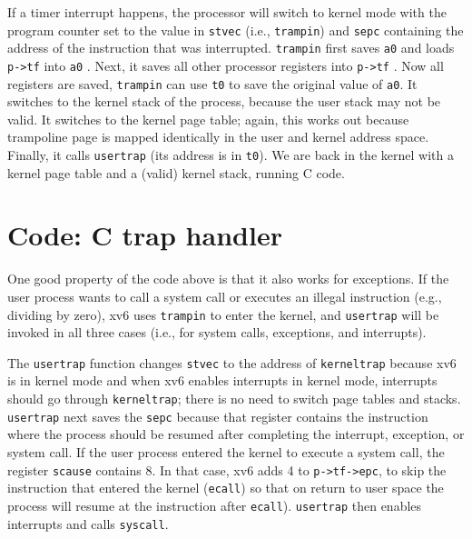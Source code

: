 If a timer interrupt happens, the processor will switch to kernel mode
with the program counter set to the value in \lstinline{stvec} (i.e.,
\lstinline{trampin}) and \lstinline{sepc} containing the address of
the instruction that was interrupted.  \lstinline{trampin} first saves
\lstinline{a0} and loads \lstinline{p->tf} into \lstinline{a0}
.  Next, it saves all other
processor registers into \lstinline{p->tf}
.  Now all registers are
saved, \lstinline{trampin} can use \lstinline{t0} to save the original
value of \lstinline{a0}.  It switches to the kernel stack of the
process, because the user stack may not be valid.  It switches to the
kernel page table; again, this works out because trampoline page is
mapped identically in the user and kernel address space.  Finally, it
calls \lstinline{usertrap} (its address is in \lstinline{t0}).  We are
back in the kernel with a kernel page table and a (valid) kernel
stack, running C code.

\section{Code: C trap handler}

One good property of the code above is that it also works for
exceptions.  If the user process wants to call a system call or
executes an illegal instruction (e.g., dividing by zero), xv6 uses
\lstinline{trampin} to enter the kernel, and \lstinline{usertrap} will
be invoked in all three cases (i.e., for system calls, exceptions, and
interrupts).

The \lstinline{usertrap} function changes \lstinline{stvec} to the
address of \lstinline{kerneltrap} because xv6 is in kernel mode and
when xv6 enables interrupts in kernel mode, interrupts should go
through \lstinline{kerneltrap}; there is no need to switch page tables
and stacks. \lstinline{usertrap} next saves the \lstinline{sepc}
because that register contains the instruction where the process
should be resumed after completing the interrupt, exception, or system
call.  If the user process entered the kernel to execute a system
call, the register \lstinline{scause} contains 8.  In that case, xv6
adds 4 to \lstinline{p->tf->epc}, to skip the instruction that entered
the kernel (\lstinline{ecall}) so that on return to user space the
process will resume at the instruction after \lstinline{ecall}).
\lstinline{usertrap} then enables interrupts and calls
\lstinline{syscall}.

